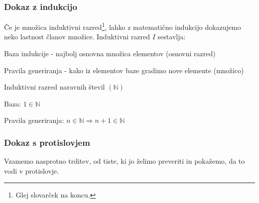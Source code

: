 \documentclass[10pt,a4paper,oneside]{book}
\begin{document}
\subsubsection{Dokaz z indukcijo}
Če je množica induktivni razred\footnote{Glej slovarček na koncu.}, lahko z matematično indukcijo dokazujemo neko lastnost članov množice.
\br
Induktivni razred $I$ sestavlja:
\begin{items}
\item Baza indukcije - najbolj osnovna množica elementov (osnovni razred)
\item Pravila generiranja - kako iz elementov baze gradimo nove elemente (množico)
\end{items}
\begin{primeri}
\item Induktivni razred naravnih števil $(\mathbb{N})$
	\begin{items}
	\item Baza: $1 \in \mathbb{N}$ 
	\item Pravila generiranja: $n \in \mathbb{N} \Longrightarrow n+1 \in \mathbb{N} $
	\end{items}
\item {}
\end{primeri}

\subsubsection{Dokaz s protislovjem}
Vzamemo nasprotno trditev, od tiste, ki jo želimo preveriti in pokažemo, da to vodi v protislovje.
\end{document}
